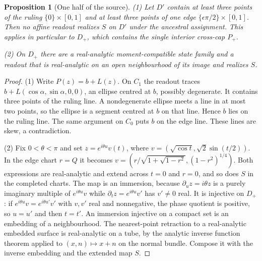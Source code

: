 \documentclass[11pt]{article}
\newtheorem{proposition}[theorem]{Proposition}
\theoremstyle{definition}\newtheorem{definition}[theorem]{Definition}
\theoremstyle{remark}\newtheorem{remark}[theorem]{Remark}
\begin{document}
\begin{proposition}[One half of the source]\label{prop:half}
(1) Let $D'$ contain at least three points of the ruling $\{0\}\times[0,1]$ and
at least three points of one edge $\{\epsilon\pi/2\}\times[0,1]$. Then no affine
readout realizes $S$ on $D'$ under the ancestral assignment. This applies in
particular to $D_+$, which contains the single interior cross-cap $P_+$.

(2) On $D_+$ there are a real-analytic moment-compatible state family and a
readout that is real-analytic on an open neighbourhood of its image and
realizes $S$.
\end{proposition}
\begin{proof}
(1) Write $P(z)=b+L(z)$. On $C_1$ the readout traces $b+L(\cos\alpha,\sin\alpha,0,0)$,
an ellipse centred at $b$, possibly degenerate. It contains three points of
the ruling line. A nondegenerate ellipse meets a line in at most two points, so
the ellipse is a segment centred at $b$ on that line. Hence $b$ lies on the
ruling line. The same argument on $C_0$ puts $b$ on the edge line. These lines
are skew, a contradiction.

(2) Fix $0<\theta<\pi$ and set $z=e^{i\theta u}v(t)$, where
$v=(\sqrt{\cos t},\sqrt2\sin(t/2))$. In the edge chart $r=Q$ it becomes
$v=(r/\sqrt{1+\sqrt{1-r^2}},(1-r^2)^{1/4})$. Both expressions are real-analytic
and extend across $t=0$ and $r=0$, and so does $S$ in the completed charts. The
map is an immersion, because $\partial_u z=i\theta z$ is a purely imaginary
multiple of $e^{i\theta u}v$ while $\partial_tz=e^{i\theta u}v'$ has $v'\neq0$
real. It is injective on $D_+$: if $e^{i\theta u}v=e^{i\theta u'}v'$ with $v,v'$
real and nonnegative, the phase quotient is positive, so $u=u'$ and then $t=t'$.
An immersion injective on a compact set is an embedding of a neighbourhood. The
nearest-point retraction to a real-analytic embedded surface is real-analytic on a
tube, by the analytic inverse function theorem applied to $(x,n)\mapsto x+n$ on
the normal bundle. Compose it with the inverse embedding and the extended map
$S$.
\end{proof}
\end{document}

